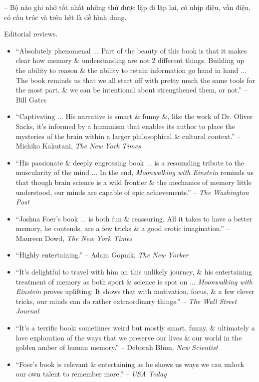 \documentclass{article}
\begin{document}
\begin{enumerate}
\begin{itemize}
		-- Bộ não ghi nhớ tốt nhất những thứ được lặp đi lặp lại, có nhịp điệu, vần điệu, có cấu trúc và trên hết là dễ hình dung.
	\end{itemize}
	{\sf Editorial reviews.}
	\begin{itemize}
		\item ``Absolutely phenomenal $\ldots$ Part of the beauty of this book is that it makes clear how memory \& understanding are not 2 different things. Building up the ability to reason \& the ability to retain information go hand in hand $\ldots$ The book reminds us that we all start off with pretty much the same tools for the most part, \& we can be intentional about strengthened them, or not.'' -- {\sc Bill Gates}
		\item ``Captivating $\ldots$ His narrative is smart \& funny \&, like the work of Dr. {\sc Oliver Sacks}, it's informed by a humanism that enables its author to place the mysteries of the brain within a larger philosophical \& cultural context.'' -- {\sc Michiko Kakutani}, {\it The New York Times}
		\item ``His passionate \& deeply engrossing book $\ldots$ is a resounding tribute to the muscularity of the mind $\ldots$ In the end, {\it Moonwalking with {\sc Einstein}} reminds us that though brain science is a wild frontier \& the mechanics of memory little understood, our minds are capable of epic achievements.'' -- {\it The Washington Post}
		\item ``{\sc Joshua Foer}'s book $\ldots$ is both fun \& reassuring. All it takes to have a better memory, he contends, are a few tricks \& a good erotic imagination.'' -- {\sc Maureen Dowd}, {\it The New York Times}
		\item ``Highly entertaining.'' -- {\sc Adam Gopnik}, {\it The New Yorker}
		\item ``It's delightful to travel with him on this unlikely journey, \& his entertaining treatment of memory as both sport \& science is spot on $\ldots$ {\it Moonwalking with {\sc Einstein}} proves uplifting: It shows that with motivation, focus, \& a few clever tricks, our minds can do rather extraordinary things.'' -- {\it The Wall Street Journal}
		\item ``It's a terrific book: sometimes weird but mostly smart, funny, \& ultimately a love exploration of the ways that we preserve our lives \& our world in the golden amber of human memory.'' -- {\sc Deborah Blum}, {\it New Scientist}
		\item ``{\sf Foer}'s book is relevant \& entertaining as he shows us ways we can unlock our own talent to remember more.'' -- {\it USA Today}

\end{itemize}
\end{enumerate}
\end{document}
